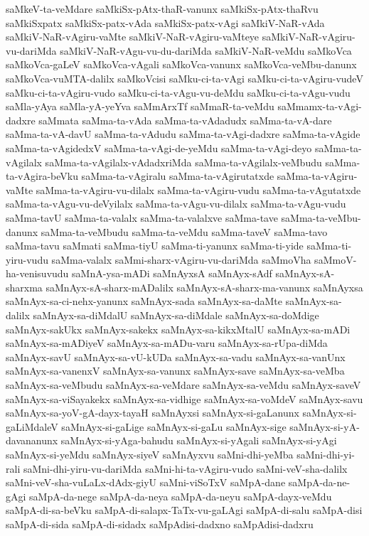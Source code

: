 {saMkeV-ta-veMdare
saMkiSx-pAtx-thaR-vanunx
saMkiSx-pAtx-thaRvu
saMkiSxpatx
saMkiSx-patx-vAda
saMkiSx-patx-vAgi
saMkiV-NaR-vAda
saMkiV-NaR-vAgiru-vaMte
saMkiV-NaR-vAgiru-vaMteye
saMkiV-NaR-vAgiru-vu-dariMda
saMkiV-NaR-vAgu-vu-du-dariMda
saMkiV-NaR-veMdu
saMkoVca
saMkoVca-gaLeV
saMkoVca-vAgali
saMkoVca-vanunx
saMkoVca-veMbu-danunx
saMkoVca-vuMTA-dalilx
saMkoVcisi
saMku-ci-ta-vAgi
saMku-ci-ta-vAgiru-vudeV
saMku-ci-ta-vAgiru-vudo
saMku-ci-ta-vAgu-vu-deMdu
saMku-ci-ta-vAgu-vudu
saMla-yAya
saMla-yA-yeYva
saMmArxTf
saMmaR-ta-veMdu
saMmamx-ta-vAgi-dadxre
saMmata
saMma-ta-vAda
saMma-ta-vAdadudx
saMma-ta-vA-dare
saMma-ta-vA-davU
saMma-ta-vAdudu
saMma-ta-vAgi-dadxre
saMma-ta-vAgide
saMma-ta-vAgidedxV
saMma-ta-vAgi-de-yeMdu
saMma-ta-vAgi-deyo
saMma-ta-vAgilalx
saMma-ta-vAgilalx-vAdadxriMda
saMma-ta-vAgilalx-veMbudu
saMma-ta-vAgira-beVku
saMma-ta-vAgiralu
saMma-ta-vAgirutatxde
saMma-ta-vAgiru-vaMte
saMma-ta-vAgiru-vu-dilalx
saMma-ta-vAgiru-vudu
saMma-ta-vAgutatxde
saMma-ta-vAgu-vu-deVyilalx
saMma-ta-vAgu-vu-dilalx
saMma-ta-vAgu-vudu
saMma-tavU
saMma-ta-valalx
saMma-ta-valalxve
saMma-tave
saMma-ta-veMbu-danunx
saMma-ta-veMbudu
saMma-ta-veMdu
saMma-taveV
saMma-tavo
saMma-tavu
saMmati
saMma-tiyU
saMma-ti-yanunx
saMma-ti-yide
saMma-ti-yiru-vudu
saMma-valalx
saMmi-sharx-vAgiru-vu-dariMda
saMmoVha
saMmoV-ha-venisuvudu
saMnA-ysa-mADi
saMnAyxsA
saMnAyx-sAdf
saMnAyx-sA-sharxma
saMnAyx-sA-sharx-mADalilx
saMnAyx-sA-sharx-ma-vanunx
saMnAyxsa
saMnAyx-sa-ci-nehx-yanunx
saMnAyx-sada
saMnAyx-sa-daMte
saMnAyx-sa-dalilx
saMnAyx-sa-diMdalU
saMnAyx-sa-diMdale
saMnAyx-sa-doMdige
saMnAyx-sakUkx
saMnAyx-sakekx
saMnAyx-sa-kikxMtalU
saMnAyx-sa-mADi
saMnAyx-sa-mADiyeV
saMnAyx-sa-mADu-varu
saMnAyx-sa-rUpa-diMda
saMnAyx-savU
saMnAyx-sa-vU-kUDa
saMnAyx-sa-vadu
saMnAyx-sa-vanUnx
saMnAyx-sa-vanenxV
saMnAyx-sa-vanunx
saMnAyx-save
saMnAyx-sa-veMba
saMnAyx-sa-veMbudu
saMnAyx-sa-veMdare
saMnAyx-sa-veMdu
saMnAyx-saveV
saMnAyx-sa-viSayakekx
saMnAyx-sa-vidhige
saMnAyx-sa-voMdeV
saMnAyx-savu
saMnAyx-sa-yoV-gA-dayx-tayaH
saMnAyxsi
saMnAyx-si-gaLanunx
saMnAyx-si-gaLiMdaleV
saMnAyx-si-gaLige
saMnAyx-si-gaLu
saMnAyx-sige
saMnAyx-si-yA-davananunx
saMnAyx-si-yAga-bahudu
saMnAyx-si-yAgali
saMnAyx-si-yAgi
saMnAyx-si-yeMdu
saMnAyx-siyeV
saMnAyxvu
saMni-dhi-yeMba
saMni-dhi-yi-rali
saMni-dhi-yiru-vu-dariMda
saMni-hi-ta-vAgiru-vudo
saMni-veV-sha-dalilx
saMni-veV-sha-vuLaLx-dAdx-giyU
saMni-viSoTxV
saMpA-dane
saMpA-da-ne-gAgi
saMpA-da-nege
saMpA-da-neya
saMpA-da-neyu
saMpA-dayx-veMdu
saMpA-di-sa-beVku
saMpA-di-salapx-TaTx-vu-gaLAgi
saMpA-di-salu
saMpA-disi
saMpA-di-sida
saMpA-di-sidadx
saMpAdisi-dadxno
saMpAdisi-dadxru
}
